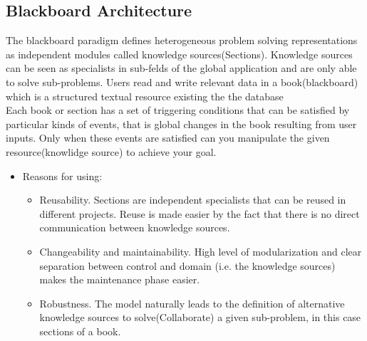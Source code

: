 	\subsection{Blackboard Architecture}
\par{The blackboard paradigm defines heterogeneous problem solving representations as independent modules called
knowledge sources(Sections). Knowledge sources can be seen as specialists in sub-felds of the global application and are
only able to solve sub-problems.
Users read and write relevant data in a book(blackboard) which is a structured textual resource existing the the database
\\

Each book or section has a set of triggering conditions that can be satisfied by particular kinds of events, that is
global changes in the book resulting from user inputs. Only when these events are satisfied can you manipulate the given resource(knowlidge source)
to achieve your goal.
}
\begin{itemize}
			\item Reasons for using:
				\begin{itemize}
					\item Reusability. Sections are independent specialists that can be reused in different projects. Reuse
is made easier by the fact that there is no direct communication between knowledge sources. 
\item Changeability and maintainability. High level of modularization and clear separation between control and
domain (i.e. the knowledge sources) makes the maintenance phase easier. 
\item Robustness. The model naturally leads to the definition of alternative knowledge sources to solve(Collaborate) a given sub-problem, in this case sections of a book.
				\end{itemize}
\end{itemize}
	
%